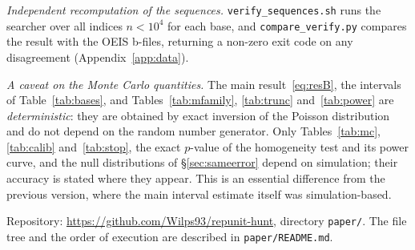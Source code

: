 \documentclass[11pt,a4paper]{article}
\theoremstyle{plain}
\theoremstyle{remark}
\begin{document}
\emph{Independent recomputation of the sequences.}
\texttt{verify\_sequences.sh} runs the searcher over all indices $n<10^4$ for
each base, and \texttt{compare\_verify.py} compares the result with the OEIS
b-files, returning a non-zero exit code on any disagreement
(Appendix~\ref{app:data}).

\emph{A caveat on the Monte Carlo quantities.} The main result~\eqref{eq:resB},
the intervals of Table~\ref{tab:bases}, and Tables~\ref{tab:mfamily},
\ref{tab:trunc} and~\ref{tab:power} are \emph{deterministic}: they are obtained by exact
inversion of the Poisson distribution and do not depend on the random number
generator. Only Tables~\ref{tab:mc}, \ref{tab:calib} and~\ref{tab:stop}, the
exact $p$-value of the homogeneity test and its power curve, and the null
distributions of \S\ref{sec:sameerror} depend on simulation; their accuracy is
stated where they appear. This is an essential difference from the previous
version, where the main interval estimate itself was simulation-based.

Repository: \url{https://github.com/Wilps93/repunit-hunt}, directory
\texttt{paper/}. The file tree and the order of execution are described in
\texttt{paper/README.md}.
\end{document}
